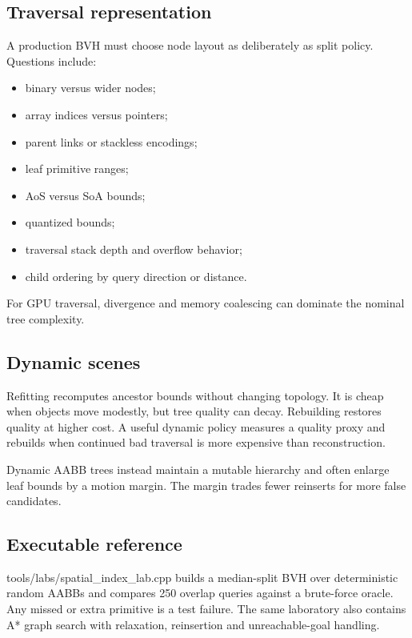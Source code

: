 \subsection{Traversal representation}\label{appendix-5653a7aea6bb-traversal-representation}

A production BVH must choose node layout as deliberately as split policy. Questions include:

\begin{itemize}
\tightlist
\item
  binary versus wider nodes;
\item
  array indices versus pointers;
\item
  parent links or stackless encodings;
\item
  leaf primitive ranges;
\item
  AoS versus SoA bounds;
\item
  quantized bounds;
\item
  traversal stack depth and overflow behavior;
\item
  child ordering by query direction or distance.
\end{itemize}

For GPU traversal, divergence and memory coalescing can dominate the nominal tree complexity.

\subsection{Dynamic scenes}\label{appendix-5653a7aea6bb-dynamic-scenes}

Refitting recomputes ancestor bounds without changing topology. It is cheap when objects move modestly, but tree quality can decay. Rebuilding restores quality at higher cost. A useful dynamic policy measures a quality proxy and rebuilds when continued bad traversal is more expensive than reconstruction.

Dynamic AABB trees instead maintain a mutable hierarchy and often enlarge leaf bounds by a motion margin. The margin trades fewer reinserts for more false candidates.

\subsection{Executable reference}\label{appendix-5653a7aea6bb-executable-reference}

tools/labs/spatial\_index\_lab.cpp builds a median-split BVH over deterministic random AABBs and compares 250 overlap queries against a brute-force oracle. Any missed or extra primitive is a test failure. The same laboratory also contains A* graph search with relaxation, reinsertion and unreachable-goal handling.

